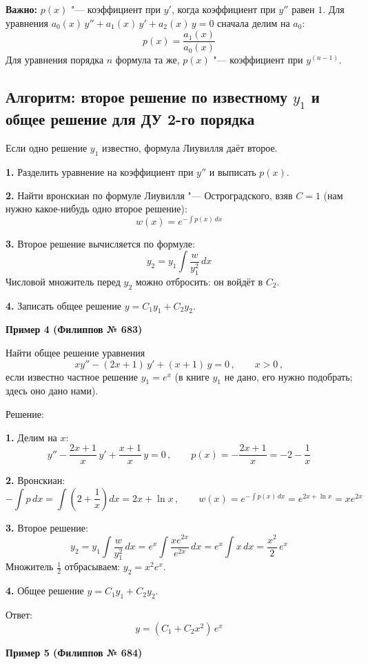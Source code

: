 \documentclass[11pt,a4paper]{article}
\newcommand{\example}[1]{\par\medskip\noindent\textbf{#1}\par\nopagebreak\smallskip}
\begin{document}
\textbf{Важно:} $p(x)$ "--- коэффициент при $y'$, когда коэффициент при $y''$ равен $1$. Для уравнения $a_0(x)\, y'' + a_1(x)\, y' + a_2(x)\, y = 0$ сначала делим на $a_0$:
\[
  p(x) = \frac{a_1(x)}{a_0(x)}
\]
Для уравнения порядка $n$ формула та же, $p(x)$ "--- коэффициент при $y^{(n-1)}$.

\subsection*{Алгоритм: второе решение по известному $y_1$ и общее решение для ДУ 2-го порядка}

Если одно решение $y_1$ известно, формула Лиувилля даёт второе.

\textbf{1.} Разделить уравнение на коэффициент при $y''$ и выписать $p(x)$.

\textbf{2.} Найти вронскиан по формуле Лиувилля "--- Остроградского, взяв $C = 1$ (нам нужно какое-нибудь одно второе решение):
\[
  w(x) = e^{-\int p(x)\,dx}
\]

\textbf{3.} Второе решение вычисляется по формуле:
\[
  y_2 = y_1 \int \frac{w}{y_1^2}\,dx
\]
Числовой множитель перед $y_2$ можно отбросить: он войдёт в $C_2$.

\textbf{4.} Записать общее решение $y = C_1 y_1 + C_2 y_2$.

\example{Пример 4 (Филиппов № 683)}

Найти общее решение уравнения
\[
  x y'' - (2x + 1)\, y' + (x + 1)\, y = 0\,, \qquad x > 0\,,
\]
если известно частное решение $y_1 = e^{x}$ (в книге $y_1$ не дано, его нужно подобрать; здесь оно дано нами).

Решение:

\textbf{1.} Делим на $x$:
\[
  y'' - \frac{2x + 1}{x}\, y' + \frac{x + 1}{x}\, y = 0\,, \qquad
  p(x) = -\frac{2x + 1}{x} = -2 - \frac1x
\]

\textbf{2.} Вронскиан:
\[
  -\int p\,dx = \int \left(2 + \frac1x\right) dx = 2x + \ln x\,, \qquad
  w(x) = e^{-\int p(x)\,dx} = e^{2x + \ln x} = x e^{2x}
\]

\textbf{3.} Второе решение:
\[
  y_2 = y_1 \int \frac{w}{y_1^2}\,dx = e^x\int\frac{xe^{2x}}{e^{2x}}\,dx = e^x \int x\,dx = \frac{x^2}{2}\, e^{x}
\]
Множитель $\frac12$ отбрасываем: $y_2 = x^2 e^{x}$.

\textbf{4.} Общее решение $y = C_1 y_1 + C_2 y_2$.

Ответ:
\[
  y = (C_1 + C_2 x^2)\, e^{x}
\]

\example{Пример 5 (Филиппов № 684)}
\end{document}
